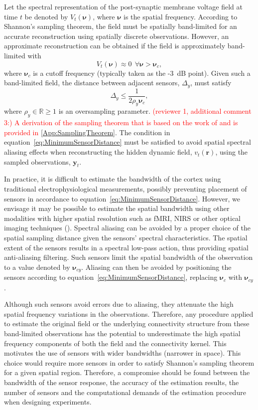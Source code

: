 \documentclass[review,authoryear,3p]{elsarticle}
\newcommand{\dean}[1]{\textcolor{red}{#1}}
\begin{document}
Let the spectral representation of the post-synaptic membrane voltage field at time $t$ be denoted by $V_t(\boldsymbol{\nu})$, where $\boldsymbol\nu$ is the spatial frequency. According to Shannon's sampling theorem, the field must be spatially band-limited for an accurate reconstruction using spatially discrete observations. However, an approximate reconstruction can be obtained if the field is approximately band-limited with 
\begin{equation}
	V_t(\boldsymbol{\nu}) \approx 0 ~ \ \forall \boldsymbol{\nu} > \boldsymbol{\nu}_c,
\end{equation}
where $\boldsymbol{\nu}_c$ is a cutoff frequency (typically taken as the -3~dB point). Given such a band-limited field, the distance between adjacent sensors, $\Delta_y$, must satisfy 
\begin{equation}
	\label{eq:MinimumSensorDistance} \Delta_y \leq \frac{1}{2\rho_y\boldsymbol{\nu}_{c}}, 
\end{equation}
where $\rho_y \in \mathbb{R} \ge 1$ is an oversampling parameter. \dean{(reviewer 1, additional comment 3:) A derivation of the sampling theorem that is based on the work of \citet{Sanner1992} and \citet{Scerri2009} is provided in \ref{App:SamplingTheorem}}. The condition in equation~\ref{eq:MinimumSensorDistance} must be satisfied to avoid spatial spectral aliasing effects when reconstructing the hidden dynamic field, $v_t(\mathbf{r})$, using the sampled observations, $\mathbf{y}_t$.

In practice, it is difficult to estimate the bandwidth of the cortex using traditional electrophysiological measurements, possibly preventing placement of sensors in accordance to equation~\ref{eq:MinimumSensorDistance}. However, we envisage it may be possible to estimate the spatial bandwidth using other modalities with higher spatial resolution such as fMRI, NIRS or other optical imaging techniques (\cite{Issa2000}). Spectral aliasing can be avoided by a proper choice of the spatial sampling distance given the sensors' spectral characteristics. The spatial extent of the sensors results in a spectral low-pass action, thus providing spatial anti-aliasing filtering. Such sensors limit the spatial bandwidth of the observation to a value denoted by $\boldsymbol{\nu}_{cy}$. Aliasing can then be avoided by positioning the sensors according to equation~\ref{eq:MinimumSensorDistance}, replacing $\boldsymbol{\nu}_c$ with $\boldsymbol{\nu}_{cy}$.

Although such sensors avoid errors due to aliasing, they attenuate the high spatial frequency variations in the observations. Therefore, any procedure applied to estimate the original field or the underlying connectivity structure from these band-limited observations has the potential to underestimate the high spatial frequency components of both the field and the connectivity kernel. This motivates the use of sensors with wider bandwidths (narrower in space). This choice would require more sensors in order to satisfy Shannon's sampling theorem for a given spatial region. Therefore, a compromise should be found between the bandwidth of the sensor response, the accuracy of the estimation results, the number of sensors and the computational demands of the estimation procedure when designing experiments.
\end{document}
